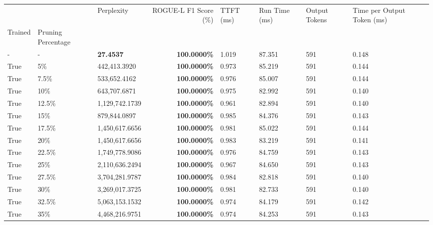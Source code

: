 \begin{table}[H]
\label{tab:evaluation-pipeline-4-trained}
\begin{tabular}{lllrllll}
\toprule
 &  & Perplexity & ROGUE-L F1 Score (\%) & TTFT (ms) & Run Time (ms) & Output Tokens & Time per Output Token (ms) \\
Trained & Pruning Percentage &  &  &  &  &  &  \\
\midrule
- & - & \bfseries 27.4537 & \bfseries 100.0000\% & 1.019 & 87.351 & 591 & 0.148 \\
\cline{1-8} \cline{2-8}
True & 5\% & 442,413.3920 & \bfseries \color{red} 100.0000\% & 0.973 & 85.219 & 591 & 0.144 \\
\cline{1-8} \cline{2-8}
True & 7.5\% & 533,652.4162 & \bfseries \color{red} 100.0000\% & 0.976 & 85.007 & 591 & 0.144 \\
\cline{1-8} \cline{2-8}
True & 10\% & 643,707.6871 & \bfseries \color{red} 100.0000\% & 0.975 & 82.992 & 591 & 0.140 \\
\cline{1-8} \cline{2-8}
True & 12.5\% & 1,129,742.1739 & \bfseries \color{red} 100.0000\% & 0.961 & 82.894 & 591 & 0.140 \\
\cline{1-8} \cline{2-8}
True & 15\% & 879,844.0897 & \bfseries \color{red} 100.0000\% & 0.985 & 84.376 & 591 & 0.143 \\
\cline{1-8} \cline{2-8}
True & 17.5\% & 1,450,617.6656 & \bfseries \color{red} 100.0000\% & 0.981 & 85.022 & 591 & 0.144 \\
\cline{1-8} \cline{2-8}
True & 20\% & 1,450,617.6656 & \bfseries \color{red} 100.0000\% & 0.983 & 83.219 & 591 & 0.141 \\
\cline{1-8} \cline{2-8}
True & 22.5\% & 1,749,778.9086 & \bfseries \color{red} 100.0000\% & 0.976 & 84.759 & 591 & 0.143 \\
\cline{1-8} \cline{2-8}
True & 25\% & 2,110,636.2494 & \bfseries \color{red} 100.0000\% & 0.967 & 84.650 & 591 & 0.143 \\
\cline{1-8} \cline{2-8}
True & 27.5\% & 3,704,281.9787 & \bfseries \color{red} 100.0000\% & 0.984 & 82.818 & 591 & 0.140 \\
\cline{1-8} \cline{2-8}
True & 30\% & 3,269,017.3725 & \bfseries \color{red} 100.0000\% & 0.981 & 82.733 & 591 & 0.140 \\
\cline{1-8} \cline{2-8}
True & 32.5\% & 5,063,153.1532 & \bfseries \color{red} 100.0000\% & 0.974 & 84.179 & 591 & 0.142 \\
\cline{1-8} \cline{2-8}
True & 35\% & 4,468,216.9751 & \bfseries \color{red} 100.0000\% & 0.974 & 84.253 & 591 & 0.143 \\

\end{tabular}
\end{table}
